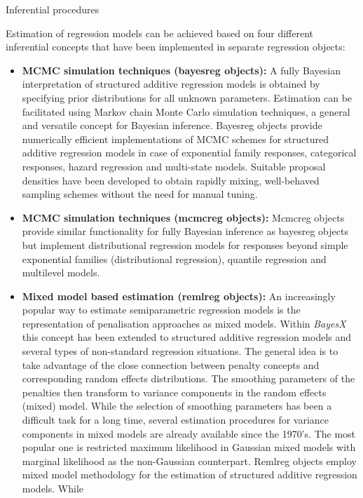 \begin{stanza}{Inferential procedures}

Estimation of regression models can be achieved based on four
different inferential concepts that have been implemented in
separate regression objects:

\begin{itemize}
\item {\bf\sffamily MCMC simulation techniques (bayesreg objects):} A fully Bayesian interpretation of structured additive
    regression models is obtained by specifying prior distributions for all unknown parameters. Estimation can be
    facilitated using Markov chain Monte Carlo simulation techniques, a general and versatile concept for Bayesian
    inference. Bayesreg objects provide numerically efficient implementations of MCMC schemes for structured additive
    regression models in case of exponential family responses, categorical responses, hazard regression and multi-state models.
    Suitable proposal densities have been developed to obtain rapidly mixing, well-behaved sampling
    schemes without the need for manual tuning.
\item {\bf\sffamily MCMC simulation techniques (mcmcreg objects):} Mcmcreg objects provide similar functionality for fully Bayesian inference as bayesreg objects but implement distributional regression models for responses beyond simple exponential families (distributional regression), quantile regression and multilevel models.
\item{\bf\sffamily Mixed model based estimation (remlreg objects):} An increasingly popular way to estimate semiparametric
    regression models is the representation of penalisation approaches as mixed models. Within {\em BayesX }this concept
    has been extended to structured additive regression  models and several types of non-standard regression situations.
    The general idea is to take advantage of the close  connection between penalty concepts and corresponding random
    effects distributions. The smoothing parameters of the  penalties then transform to variance components in the random
    effects (mixed) model. While the selection of smoothing  parameters has been a difficult task for a long time, several
    estimation procedures for variance components in mixed models are already available since the 1970's. The most popular
    one is restricted maximum likelihood in Gaussian mixed models with marginal likelihood as the non-Gaussian counterpart.
    Remlreg objects employ mixed model methodology for the estimation of structured additive regression models. While

\end{itemize}
\end{stanza}
